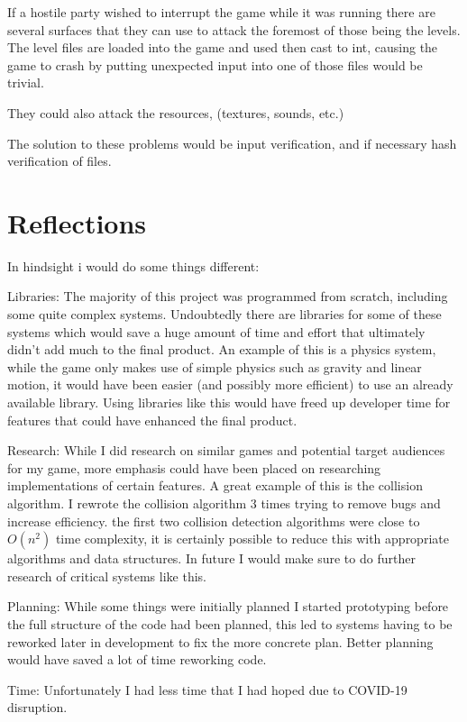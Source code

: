 \documentclass{article}
\begin{document}
If a hostile party wished to interrupt the game while it was running there are several surfaces that they can use to attack the foremost of those being the levels.
The level files are loaded into the game and used then cast to int, causing the game to crash by putting unexpected input into one of those files would be trivial.

They could also attack the resources, (textures, sounds, etc.)

The solution to these problems would be input verification, and if necessary hash verification of files.

\section{Reflections}

In hindsight i would do some things different:

Libraries: The majority of this project was programmed from scratch, including some quite complex systems. 
Undoubtedly there are libraries for some of these systems which would save a huge amount of time and effort that ultimately didn't add much to the final product.
An example of this is a physics system, while the game only makes use of simple physics such as gravity and linear motion, 
it would have been easier (and possibly more efficient) to use an already available library.
Using libraries like this would have freed up developer time for features that could have enhanced the final product.

Research: While I did research on similar games and potential target audiences for my game,
more emphasis could have been placed on researching implementations of certain features.
A great example of this is the collision algorithm. I rewrote the collision algorithm 3 times trying to remove bugs and increase efficiency.
the first two collision detection algorithms were close to $O(n^2)$ time complexity, it is certainly possible to reduce this with appropriate algorithms and data structures.
In future I would make sure to do further research of critical systems like this.

Planning: While some things were initially planned I started prototyping before the full structure of the code had been planned,
this led to systems having to be reworked later in development to fix the more concrete plan.
Better planning would have saved a lot of time reworking code.

Time: Unfortunately I had less time that I had hoped due to COVID-19 disruption.
\end{document}
